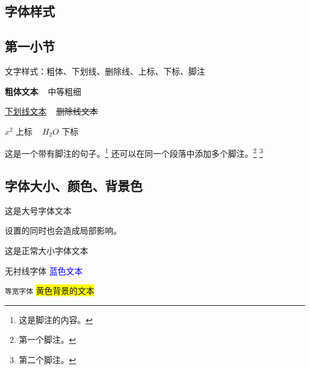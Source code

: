 \documentclass{article}
\begin{document}
\begin{CJK*}{UTF8}{gbsn}
		\clearpage
		\section{字体样式}
		\setlength{\parskip}{1em}
		\subsection{第一小节}
		\begin{flushleft}

		文字样式：粗体、下划线、删除线、上标、下标、脚注

		\textbf{粗体文本} ~ \textmd{中等粗细} \par
		\uline{下划线文本} ~ \sout{删除线文本} \par
		$x^2$  上标 ~ $H_2O$ 下标 \par

		这是一个带有脚注的句子。\footnote{这是脚注的内容。}
		还可以在同一个段落中添加多个脚注。\footnote{第一个脚注。} \footnote{第二个脚注。}

		\subsection{字体大小、颜色、背景色}
		\Large 这是大号字体文本 \par
		设置的同时也会造成局部影响。\par
		\normalsize 这是正常大小字体文本 \par
		\textsf{无衬线字体} \textcolor{blue}{蓝色文本} \par
		\texttt{等宽字体} \colorbox{yellow}{黄色背景的文本} \par

		\end{flushleft}

		\clearpage

\end{CJK*}
\end{document}
